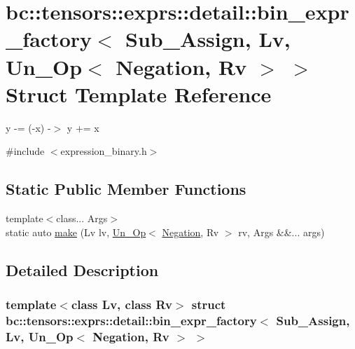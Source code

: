 \hypertarget{structbc_1_1tensors_1_1exprs_1_1detail_1_1bin__expr__factory_3_01Sub__Assign_00_01Lv_00_01Un__Op_3_01Negation_00_01Rv_01_4_01_4}{}\section{bc\+:\+:tensors\+:\+:exprs\+:\+:detail\+:\+:bin\+\_\+expr\+\_\+factory$<$ Sub\+\_\+\+Assign, Lv, Un\+\_\+\+Op$<$ Negation, Rv $>$ $>$ Struct Template Reference}
\label{structbc_1_1tensors_1_1exprs_1_1detail_1_1bin__expr__factory_3_01Sub__Assign_00_01Lv_00_01Un__Op_3_01Negation_00_01Rv_01_4_01_4}


y -\/= (-\/x) -\/$>$ y += x  




{\ttfamily \#include $<$expression\+\_\+binary.\+h$>$}

\subsection*{Static Public Member Functions}
\begin{DoxyCompactItemize}
\item 
{\footnotesize template$<$class... Args$>$ }\\static auto \hyperlink{structbc_1_1tensors_1_1exprs_1_1detail_1_1bin__expr__factory_3_01Sub__Assign_00_01Lv_00_01Un__Op_3_01Negation_00_01Rv_01_4_01_4_a382f87237b09eaf4701c09bcafa3633e}{make} (Lv lv, \hyperlink{structbc_1_1tensors_1_1exprs_1_1Un__Op}{Un\+\_\+\+Op}$<$ \hyperlink{structbc_1_1oper_1_1Negation}{Negation}, Rv $>$ rv, Args \&\&... args)
\end{DoxyCompactItemize}


\subsection{Detailed Description}
\subsubsection*{template$<$class Lv, class Rv$>$\newline
struct bc\+::tensors\+::exprs\+::detail\+::bin\+\_\+expr\+\_\+factory$<$ Sub\+\_\+\+Assign, Lv, Un\+\_\+\+Op$<$ Negation, Rv $>$ $>$}

